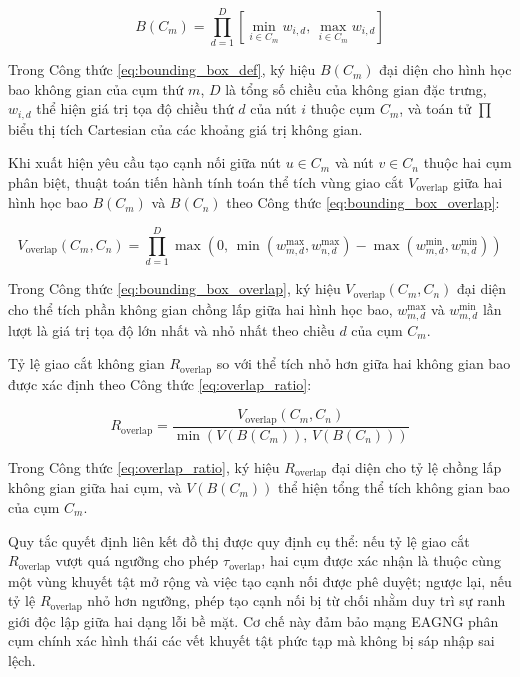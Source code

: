 \begin{equation}
B(C_m) = \prod_{d=1}^{D} \left[ \min_{i \in C_m} w_{i,d}, \, \max_{i \in C_m} w_{i,d} \right]
\label{eq:bounding_box_def}
\end{equation}

Trong Công thức \ref{eq:bounding_box_def}, ký hiệu $B(C_m)$ đại diện cho hình học bao không gian của cụm thứ $m$, $D$ là tổng số chiều của không gian đặc trưng, $w_{i,d}$ thể hiện giá trị tọa độ chiều thứ $d$ của nút $i$ thuộc cụm $C_m$, và toán tử $\prod$ biểu thị tích Cartesian của các khoảng giá trị không gian.

Khi xuất hiện yêu cầu tạo cạnh nối giữa nút $u \in C_m$ và nút $v \in C_n$ thuộc hai cụm phân biệt, thuật toán tiến hành tính toán thể tích vùng giao cắt $V_{\text{overlap}}$ giữa hai hình học bao $B(C_m)$ và $B(C_n)$ theo Công thức \ref{eq:bounding_box_overlap}:

\begin{equation}
V_{\text{overlap}}(C_m, C_n) = \prod_{d=1}^{D} \max\left(0, \, \min\left(w_{m,d}^{\text{max}}, w_{n,d}^{\text{max}}\right) - \max\left(w_{m,d}^{\text{min}}, w_{n,d}^{\text{min}}\right)\right)
\label{eq:bounding_box_overlap}
\end{equation}

Trong Công thức \ref{eq:bounding_box_overlap}, ký hiệu $V_{\text{overlap}}(C_m, C_n)$ đại diện cho thể tích phần không gian chồng lấp giữa hai hình học bao, $w_{m,d}^{\text{max}}$ và $w_{m,d}^{\text{min}}$ lần lượt là giá trị tọa độ lớn nhất và nhỏ nhất theo chiều $d$ của cụm $C_m$.

Tỷ lệ giao cắt không gian $R_{\text{overlap}}$ so với thể tích nhỏ hơn giữa hai không gian bao được xác định theo Công thức \ref{eq:overlap_ratio}:

\begin{equation}
R_{\text{overlap}} = \frac{V_{\text{overlap}}(C_m, C_n)}{\min\left(V(B(C_m)), \, V(B(C_n))\right)}
\label{eq:overlap_ratio}
\end{equation}

Trong Công thức \ref{eq:overlap_ratio}, ký hiệu $R_{\text{overlap}}$ đại diện cho tỷ lệ chồng lấp không gian giữa hai cụm, và $V(B(C_m))$ thể hiện tổng thể tích không gian bao của cụm $C_m$.

Quy tắc quyết định liên kết đồ thị được quy định cụ thể: nếu tỷ lệ giao cắt $R_{\text{overlap}}$ vượt quá ngưỡng cho phép $\tau_{\text{overlap}}$, hai cụm được xác nhận là thuộc cùng một vùng khuyết tật mở rộng và việc tạo cạnh nối được phê duyệt; ngược lại, nếu tỷ lệ $R_{\text{overlap}}$ nhỏ hơn ngưỡng, phép tạo cạnh nối bị từ chối nhằm duy trì sự ranh giới độc lập giữa hai dạng lỗi bề mặt. Cơ chế này đảm bảo mạng EAGNG phân cụm chính xác hình thái các vết khuyết tật phức tạp mà không bị sáp nhập sai lệch.